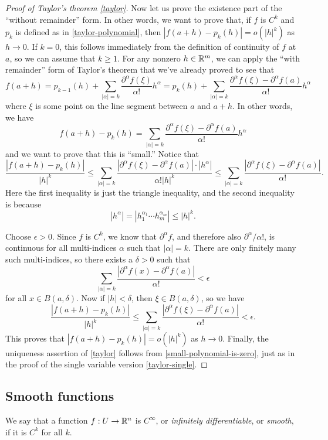 \begin{proof}[Proof of Taylor's theorem \ref{taylor}]
	Now let us prove the existence part of the ``without remainder'' form. In other words, we want to prove that, if $f$ is $C^k$ and $p_k$ is defined as in \cref{taylor-polynomial}, then $|f(a+h) - p_k(h)| = o(|h|^k)$ as $h \to 0$. If $k = 0$, this follows immediately from the definition of continuity of $f$ at $a$, so we can assume that $k \geq 1$. For any nonzero $h \in \mathbb{R}^m$, we can apply the ``with remainder'' form of Taylor's theorem that we've already proved to see that
	\[ f(a+h) = p_{k-1}(h) + \sum_{|\alpha| = k} \frac{\partial^\alpha f(\xi)}{\alpha!} h^\alpha = p_k(h) + \sum_{|\alpha| = k} \frac{\partial^\alpha f(\xi) - \partial^\alpha f(a)}{\alpha!}h^\alpha \]
	where $\xi$ is some point on the line segment between $a$ and $a + h$. In other words, we have 
	\[ f(a+h) - p_k(h) = \sum_{|\alpha| = k} \frac{\partial^\alpha f(\xi) - \partial^\alpha f(a)}{\alpha!}h^\alpha \]
	and we want to prove that this is ``small.'' Notice that 
	\[ \frac{|f(a+h) - p_k(h)|}{|h|^k} \leq \sum_{|\alpha| = k} \frac{|\partial^\alpha f(\xi) - \partial^\alpha f(a)| \cdot |h^\alpha|}{\alpha! |h|^k} \leq \sum_{|\alpha| = k} \frac{|\partial^\alpha f(\xi) - \partial^\alpha f(a)|}{\alpha!}. \]
	Here the first inequality is just the triangle inequality, and the second inequality is because 
	\[ |h^\alpha| = |h_1^{\alpha_1} \dotsb h_m^{\alpha_m}| \leq |h|^k. \]
	
	Choose $\epsilon > 0$. Since $f$ is $C^k$, we know that $\partial^\alpha f$, and therefore also $\partial^\alpha/\alpha!$, is continuous for all multi-indices $\alpha$ such that $|\alpha| = k$. There are only finitely many such multi-indices, so there exists a $\delta > 0$ such that 
	\[ \sum_{|\alpha| = k} \frac{|\partial^\alpha f(x) - \partial^\alpha f(a)|}{\alpha!} < \epsilon \]
	for all $x \in B(a, \delta)$. Now if $|h| < \delta$, then $\xi \in B(a, \delta)$, so we have 
	\[ \frac{|f(a+h) - p_k(h)|}{|h|^k} \leq \sum_{|\alpha| = k} \frac{|\partial^\alpha f(\xi) - \partial^\alpha f(a)|}{\alpha!} < \epsilon. \]
	This proves that $|f(a+h) - p_k(h)| = o(|h|^k)$ as $h \to 0$. Finally, the uniqueness assertion of \cref{taylor} follows from \cref{small-polynomial-is-zero}, just as in the proof of the single variable version \ref{taylor-single}. 
\end{proof}

\subsection{Smooth functions}

\begin{definition}[Smoothness] \label{smooth-multi} 
	We say that a function $f : U \to \mathbb{R}^n$ is $C^\infty$, or \emph{infinitely differentiable}, or \emph{smooth}, if it is $C^k$ for all $k$. 
\end{definition}

